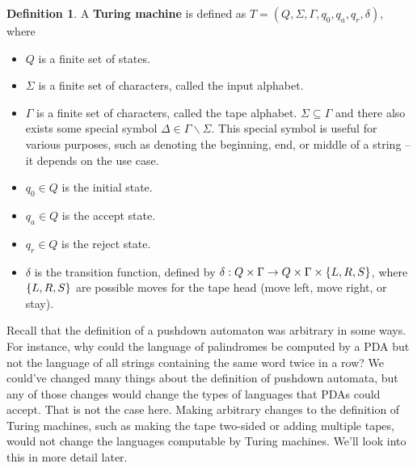 \documentclass[]{article}
\DeclarePairedDelimiter{\set}{\lbrace}{\rbrace}
\theoremstyle{definition}
\newtheorem*{defn}{Definition}
\begin{document}
      \begin{defn}
        A \textbf{Turing machine} is defined as $T = (Q, \Sigma, \Gamma, q_0, q_a, q_r, \delta)$, where
        \begin{itemize}
          \item $Q$ is a finite set of states.
          \item $\Sigma$ is a finite set of characters, called the input alphabet.
          \item $\Gamma$ is a finite set of characters, called the tape alphabet. $\Sigma \subseteq \Gamma$ and there also exists some special symbol $\Delta \in \Gamma \backslash \Sigma$. This special symbol is useful for various purposes, such as denoting the beginning, end, or middle of a string -- it depends on the use case.
          \item $q_0 \in Q$ is the initial state.
          \item $q_a \in Q$ is the accept state.
          \item $q_r \in Q$ is the reject state.
          \item $\delta$ is the transition function, defined by $\delta : Q \times \Gamma \to Q \times \Gamma \times \set{L, R, S}$, where $\set{L, R, S}$ are possible moves for the tape head (move left, move right, or stay).
        \end{itemize}
      \end{defn}

      Recall that the definition of a pushdown automaton was arbitrary in some ways. For instance, why could the language of palindromes be computed by a PDA but not the language of all strings containing the same word twice in a row? We could've changed many things about the definition of pushdown automata, but any of those changes would change the types of languages that PDAs could accept. That is not the case here. Making arbitrary changes to the definition of Turing machines, such as making the tape two-sided or adding multiple tapes, would not change the languages computable by Turing machines. We'll look into this in more detail later.
\end{document}
